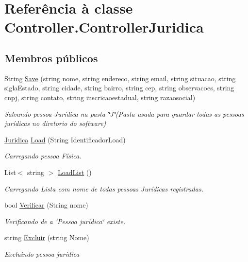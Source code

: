 \hypertarget{class_controller_1_1_controller_juridica}{}\section{Referência à classe Controller.\+Controller\+Juridica}
\label{class_controller_1_1_controller_juridica}
\subsection*{Membros públicos}
\begin{DoxyCompactItemize}
\item 
String \hyperlink{class_controller_1_1_controller_juridica_ae63ddd121c72c893e6a3238d9e328f97}{Save} (string nome, string endereco, string email, string situacao, string sigla\+Estado, string cidade, string bairro, string cep, string observacoes, string cnpj, string contato, string inscricaoestadual, string razaosocial)
\begin{DoxyCompactList}\small\item\em Salvando pessoa Jurídica na pasta \char`\"{}\+J\char`\"{}(Pasta usada para guardar todas as pessoas jurídicas no diretorio do software) \end{DoxyCompactList}\item 
\hyperlink{class_model_1_1_pessoa__e___usuario_1_1_juridica}{Juridica} \hyperlink{class_controller_1_1_controller_juridica_a7370540d60c12756550d8e637c511fdb}{Load} (String Identificador\+Load)
\begin{DoxyCompactList}\small\item\em Carregando pessoa Física. \end{DoxyCompactList}\item 
List$<$ string $>$ \hyperlink{class_controller_1_1_controller_juridica_a489991081882ef77ad15c83ae0122bcd}{Load\+List} ()
\begin{DoxyCompactList}\small\item\em Carregando Lista com nome de todas pessoas Jurídicas registradas. \end{DoxyCompactList}\item 
bool \hyperlink{class_controller_1_1_controller_juridica_ad7235f882d75bd27a125df467e77c5b7}{Verificar} (String nome)
\begin{DoxyCompactList}\small\item\em Verificando de a \char`\"{}\+Pessoa jurídica\char`\"{} existe. \end{DoxyCompactList}\item 
string \hyperlink{class_controller_1_1_controller_juridica_ac378290f0dce2fc5f3f97800a6c8a5e6}{Excluir} (string Nome)
\begin{DoxyCompactList}\small\item\em Excluindo pessoa jurídica \end{DoxyCompactList}\end{DoxyCompactItemize}



